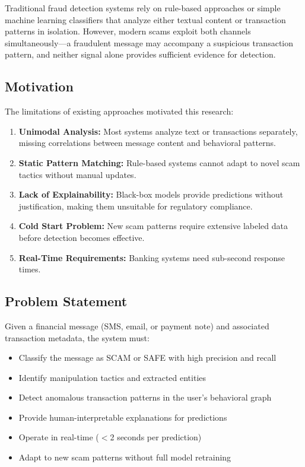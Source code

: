 \documentclass[12pt,a4paper]{article}
\begin{document}
Traditional fraud detection systems rely on rule-based approaches or simple machine learning classifiers that analyze either textual content or transaction patterns in isolation. However, modern scams exploit both channels simultaneously—a fraudulent message may accompany a suspicious transaction pattern, and neither signal alone provides sufficient evidence for detection.

\subsection{Motivation}

The limitations of existing approaches motivated this research:

\begin{enumerate}
    \item \textbf{Unimodal Analysis:} Most systems analyze text or transactions separately, missing correlations between message content and behavioral patterns.
    \item \textbf{Static Pattern Matching:} Rule-based systems cannot adapt to novel scam tactics without manual updates.
    \item \textbf{Lack of Explainability:} Black-box models provide predictions without justification, making them unsuitable for regulatory compliance.
    \item \textbf{Cold Start Problem:} New scam patterns require extensive labeled data before detection becomes effective.
    \item \textbf{Real-Time Requirements:} Banking systems need sub-second response times.
\end{enumerate}

\subsection{Problem Statement}

Given a financial message (SMS, email, or payment note) and associated transaction metadata, the system must:

\begin{itemize}
    \item Classify the message as SCAM or SAFE with high precision and recall
    \item Identify manipulation tactics and extracted entities
    \item Detect anomalous transaction patterns in the user's behavioral graph
    \item Provide human-interpretable explanations for predictions
    \item Operate in real-time ($<$2 seconds per prediction)
    \item Adapt to new scam patterns without full model retraining
\end{itemize}
\end{document}
